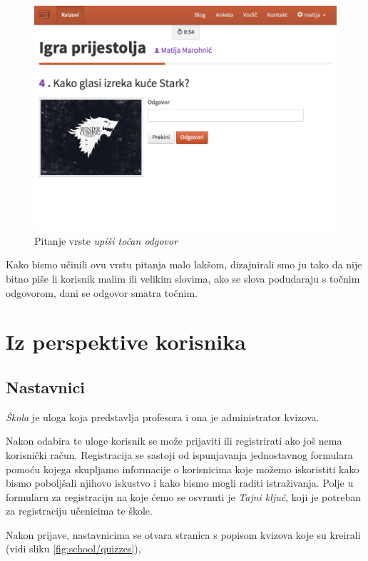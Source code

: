 \documentclass[11pt]{scrreprt}
\begin{document}
\begin{figure}[H]
  \includegraphics[width=\textwidth, clip=true, trim=0 5cm 0 0, fbox]{student/text_question}
  \caption{Pitanje vrste \emph{upiši točan odgovor}}
  \label{fig:text}
\end{figure}

Kako bismo učinili ovu vrstu pitanja malo lakšom, dizajnirali smo ju tako da
nije bitno piše li korisnik malim ili velikim slovima, ako se slova podudaraju s
točnim odgovorom, dani se odgovor smatra točnim.

\section{Iz perspektive korisnika}

\subsection{Nastavnici}

\emph{Škola} je uloga koja predstavlja profesora i ona je administrator kvizova.

Nakon odabira te uloge korisnik se može prijaviti ili registrirati ako još nema
korisnički račun. Registracija se sastoji od ispunjavanja jednostavnog formulara
pomoću kojega skupljamo informacije o korisnicima koje možemo iskoristiti kako
bismo poboljšali njihovo iskustvo i kako bismo mogli raditi istraživanja. Polje
u formularu za registraciju na koje ćemo se osvrnuti je \emph{Tajni ključ}, koji
je potreban za registraciju učenicima te škole.

Nakon prijave, nastavnicima se otvara stranica s popisom kvizova koje su
kreirali (vidi sliku \ref{fig:school/quizzes}),
\end{document}
